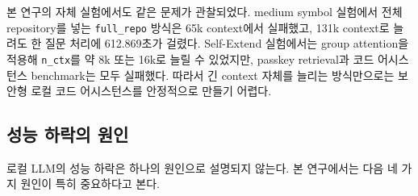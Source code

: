 \documentclass[11pt,a4paper]{article}
\begin{document}
본 연구의 자체 실험에서도 같은 문제가 관찰되었다. medium symbol 실험에서 전체 repository를 넣는 \texttt{full\_repo} 방식은 65k context에서 실패했고, 131k context로 늘려도 한 질문 처리에 612.869초가 걸렸다. Self-Extend 실험에서는 group attention을 적용해 \texttt{n\_ctx}를 약 8k 또는 16k로 늘릴 수 있었지만, passkey retrieval과 코드 어시스턴스 benchmark는 모두 실패했다. 따라서 긴 context 자체를 늘리는 방식만으로는 보안형 로컬 코드 어시스턴스를 안정적으로 만들기 어렵다.

\subsection{성능 하락의 원인}

로컬 LLM의 성능 하락은 하나의 원인으로 설명되지 않는다. 본 연구에서는 다음 네 가지 원인이 특히 중요하다고 본다.
\end{document}

